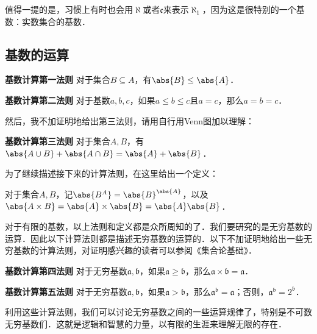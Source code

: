 值得一提的是，习惯上有时也会用$\aleph$或者$\mathfrak{c}$来表示$\aleph_1$，因为这是很特别的一个基数：实数集合的基数．




\subsection{基数的运算}

\begin{theorem}{}
\textbf{基数计算第一法则} 对于集合$B\subseteq A$，有$\abs{B}\leq\abs{A}$．
\end{theorem}

\begin{theorem}{}
\textbf{基数计算第二法则} 对于基数$a, b, c$，如果$a\leq b\leq c$且$a=c$，那么$a=b=c$．
\end{theorem}

然后，我不加证明地给出第三法则，请用自行用Venn图加以理解：

\begin{theorem}{}
\textbf{基数计算第三法则} 对于集合$A, B$，有$\abs{A\cup B}+\abs{A\cap B}=\abs{A}+\abs{B}$．
\end{theorem}

为了继续描述接下来的计算法则，在这里给出一个定义：

\begin{definition}{}
对于集合$A, B$，记$\abs{B^A}=\abs{B}^{\abs{A}}$，以及$\abs{A\times B}=\abs{A}\times\abs{B}=\abs{A}\abs{B}$．
\end{definition}

对于有限的基数，以上法则和定义都是众所周知的了．我们要研究的是无穷基数的运算．因此以下计算法则都是描述无穷基数的运算的．以下不加证明地给出一些无穷基数的计算法则，对证明感兴趣的读者可以参阅《集合论基础》\cite{BasicSetTheory}．

\begin{theorem}{}
\textbf{基数计算第四法则} 对于无穷基数$\mathfrak{a}, \mathfrak{b}$，如果$\mathfrak{a}\geq\mathfrak{b}$，那么$\mathfrak{a}\times\mathfrak{b}=\mathfrak{a}$．
\end{theorem}

\begin{theorem}{}
\textbf{基数计算第五法则} 对于无穷基数$\mathfrak{a}, \mathfrak{b}$，如果$\mathfrak{a}>\mathfrak{b}$，那么$\mathfrak{a}^\mathfrak{b}=\mathfrak{a}$；否则，$\mathfrak{a}^\mathfrak{b}=2^\mathfrak{b}$．
\end{theorem}


利用这些计算法则，我们可以讨论无穷基数之间的一些运算规律了，特别是不可数无穷基数们．这就是逻辑和智慧的力量，以有限的生涯来理解无限的存在．








